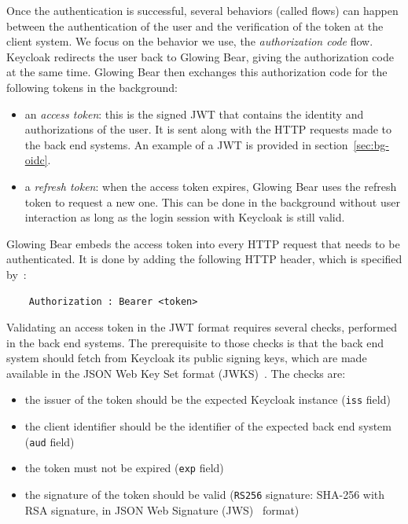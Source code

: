 Once the authentication is successful, several behaviors (called flows) can happen between the authentication of the user and the verification of the token at the client system.
We focus on the behavior we use, the \emph{authorization code} flow.
Keycloak redirects the user back to Glowing Bear, giving the authorization code at the same time.
Glowing Bear then exchanges this authorization code for the following tokens in the background:

\begin{itemize}
    \item an \emph{access token}: this is the signed JWT that contains the identity and authorizations of the user. It is sent along with the HTTP requests made to the back end systems. An example of a JWT is provided in section~\ref{sec:bg-oidc}.
    \item a \emph{refresh token}: when the access token expires, Glowing Bear uses the refresh token to request a new one. This can be done in the background without user interaction as long as the login session with Keycloak is still valid.
\end{itemize}

Glowing Bear embeds the access token into every HTTP request that needs to be authenticated.
It is done by adding the following HTTP header, which is specified by~\cite{rfc:bearertoken}:
\begin{verbatim}
    Authorization : Bearer <token>
\end{verbatim}

Validating an access token in the JWT format requires several checks, performed in the back end systems.
The prerequisite to those checks is that the back end system should fetch from Keycloak its public signing keys, which are made available in the JSON Web Key Set format (JWKS)~\cite{rfc:jwk}.
The checks are:

\begin{itemize}
    \item the issuer of the token should be the expected Keycloak instance (\verb|iss| field)
    \item the client identifier should be the identifier of the expected back end system (\verb|aud| field)
    \item the token must not be expired (\verb|exp| field)
    \item the signature of the token should be valid (\verb|RS256| signature: SHA-256 with RSA signature, in JSON Web Signature (JWS)~\cite{rfc:jws} format)
\end{itemize}

